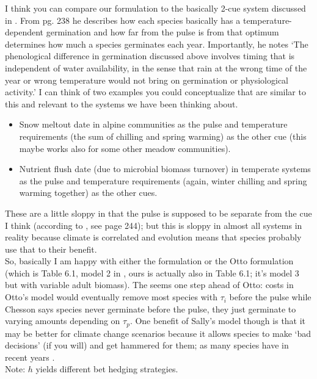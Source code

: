 \documentclass[11pt,a4paper,oneside]{article}
\begin{document}
I think you can compare our formulation to the basically 2-cue system discussed in \citet{Chesson:2004eo}. From pg. 238 he describes how each species basically has a temperature-dependent germination and how far from the pulse is from that optimum determines how much a species germinates each year. Importantly, he notes `The phenological difference in germination discussed
above involves timing that is independent of water
availability, in the sense that rain at the wrong time of
the year or wrong temperature would not bring on
germination or physiological activity.' I can think of two examples you could conceptualize that are similar to this and relevant to the systems we have been thinking about.
\begin{itemize}
\item Snow meltout date in alpine communities as the pulse and temperature requirements (the sum of chilling and spring warming) as the other cue (this maybe works also for some other meadow communities).
\item Nutrient flush date (due to microbial biomass turnover) in temperate systems as the pulse and temperature requirements (again, winter chilling and spring warming together) as the other cues. 
\end{itemize}
These are a little sloppy in that the pulse is supposed to be separate from the cue I think (according to \citet{Chesson:2004eo}, see page 244); but this is sloppy in almost all systems in reality because climate is correlated and evolution means that species probably use that to their benefit.\\

\noindent So, basically I am happy with either the \citet{Chesson:2004eo} formulation or the Otto formulation (which is Table 6.1, model 2 in \cite{chesson2008}, ours is actually also in Table 6.1; it's model 3 but with variable adult biomass). The \citet{Chesson:2004eo} seems one step ahead of Otto: costs in Otto's model would eventually remove most species with \(\tau_{i}\) before the pulse while Chesson says species never germinate before the pulse, they just germinate to varying amounts depending on \(\tau_{p}\).  One benefit of Sally's model though is that it may be better for climate change scenarios because it allows species to make `bad decisions' (if you will) and get hammered for them; as many species have in recent years \citep[e.g.,][]{Inouye:2008gj}.\\

\noindent Note: \(h\) yields different bet hedging strategies.
\end{document}
